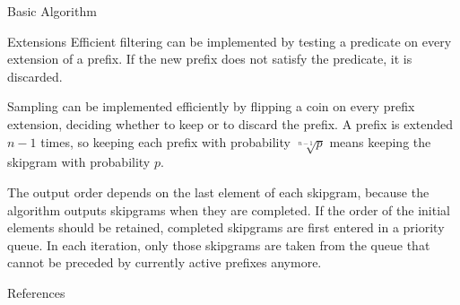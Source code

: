 \documentclass[final]{beamer}
\newcommand*{\pianoroll}{
  \draw (0,2) rectangle (1,2.4);
  \draw (1,2.4) rectangle (2,2.8);
  \draw (2,2) rectangle (2.5,2.4);
  \draw (2.5,1.6) rectangle (3,2);
  \draw (3,1.2) rectangle (3.5,1.6);
  \draw (3.5,0.8) rectangle (4,1.2);
  
  \draw (4,1.6) rectangle (5,2);
  \draw (5,2) rectangle (6,2.4);
  \draw (6,1.6) rectangle (6.5,2);
  \draw (6.5,1.2) rectangle (7,1.6);
  \draw (7,0.8) rectangle (7.5,1.2);
  \draw (7.5,0.4) rectangle (8,0.8);
  
  \draw (1,-0.4) rectangle (2,0);
  \draw (2,0) rectangle (4,0.4);
  \draw (5,-0.8) rectangle (6,-0.4);
  \draw (6,-0.4) rectangle (8,0);
}
\begin{document}
\begin{frame}[t]
\begin{columns}[t]
\begin{column}{0.3\textwidth}
\begin{block}{Basic Algorithm}
\begin{adjustbox}{scale=2,center,margin=0 1ex}
        \end{adjustbox}
      \end{block}

      \begin{block}{Extensions}
        Efficient \alert{filtering} can be implemented
        by \alert{testing a predicate} on every extension of a prefix.
        If the new prefix does not satisfy the predicate, it is discarded.

        \alert{Sampling} can be implemented efficiently
        by \alert{flipping a coin} on every prefix extension,
        deciding whether to keep or to discard the prefix.
        A prefix is extended $n-1$ times,
        so keeping each prefix with probability $\sqrt[n-1]{p}$
        means keeping the skipgram with probability $p$.

        The output order depends on the last element of each skipgram,
        because the algorithm outputs skipgrams when they are completed.
        If the \alert{order of the initial elements} should be retained,
        completed skipgrams are first entered in a \alert{priority queue}.
        In each iteration, only those skipgrams are taken from the queue
        that cannot be preceded by currently active prefixes anymore.
      \end{block}

      \begin{block}{References}
          \printbibliography
      \end{block}
    \end{column}
  \end{columns}
  
\end{frame} %
\end{document}
